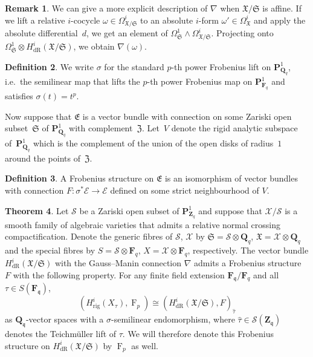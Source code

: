 \documentclass[a4paper,11pt]{article}
\numberwithin{equation}{section}
\newcommand{\ZZ}{\mathbf{Z}} %
\newcommand{\QQ}{\mathbf{Q}} %
\newcommand{\FF}{\mathbf{F}} %
\DeclareMathOperator{\Frob}{F}           %
\providecommand{\HdR}{H_{\text{dR}}}    %
\providecommand{\Hrig}{H_{\text{rig}}}  %
\theoremstyle{definition}
\newtheorem{thm}{Theorem}[section]
\newtheorem{defn}[thm]{Definition}
\newtheorem{rem}[thm]{Remark}
\begin{document}
\begin{rem}
We can give a more explicit description of $\nabla$ when 
$\mathfrak{X}/\mathfrak{S}$ is affine. If we lift a relative $i$-cocycle 
$\omega \in \Omega^i_{\mathfrak{X}/\mathfrak{S}}$ to an absolute $i$-form 
$\omega' \in \Omega^i_{\mathfrak{X}}$ and apply the absolute differential~$d$, 
we get an element of 
$\Omega^1_{\mathfrak{S}} \wedge \Omega^i_{\mathfrak{X}/\mathfrak{S}}$. 
Projecting onto 
$\Omega^1_{\mathfrak{S}} \otimes \HdR^i(\mathfrak{X}/\mathfrak{S})$, 
we obtain $\nabla(\omega)$. 
\end{rem}

\begin{defn} \label{defn:sigma}
We write $\sigma$ for the standard $p$-th power Frobenius lift on 
$\mathbf{P}^1_{\QQ_q}$, i.e.\ the semilinear map that lifts the $p$-th power 
Frobenius map on $\mathbf{P}^1_{\FF_q}$ and satisfies $\sigma(t)=t^p$. 
\end{defn}

Now suppose that $\mathfrak{E}$ is a vector bundle with connection on 
some Zariski open subset~$\mathfrak{S}$ of $\mathbf{P}^1_{\QQ_q}$ with 
complement~$\mathfrak{Z}$. Let~$V$ denote the rigid analytic subspace 
of~$\mathbf{P}^1_{\QQ_q}$ which is the complement of the union of the 
open disks of radius~$1$ around the points of~$\mathfrak{Z}$.

\begin{defn}
A Frobenius structure on $\mathfrak{E}$ is an isomorphism of vector bundles 
with connection $F \colon \sigma^* \mathcal{E} \rightarrow \mathcal{E}$ 
defined on some strict neighbourhood of $V$. 
\end{defn}

\begin{thm} \label{thm:frobstruc}
Let $\mathcal{S}$ be a Zariski open subset of $\mathbf{P}^1_{\ZZ_q}$ and 
suppose that $\mathcal{X}/\mathcal{S}$ is a smooth family of algebraic 
varieties that admits a relative normal crossing compactification. Denote 
the generic fibres of $\mathcal{S}$, $\mathcal{X}$ by 
$\mathfrak{S}=\mathcal{S} \otimes \QQ_q$, $\mathfrak{X}=\mathcal{X} \otimes \QQ_q$ 
and the special fibres by $S=\mathcal{S} \otimes \FF_q$, 
$X=\mathcal{X} \otimes \FF_q$, respectively. The vector bundle 
$\HdR^i(\mathfrak{X}/\mathfrak{S})$ with the Gauss--Manin connection $\nabla$ 
admits a Frobenius structure $F$ with the following property. 
For any finite field extension $\FF_{\mathfrak{q}}/\FF_q$ and
all $\tau \in S(\FF_{\mathfrak{q}})$,
\[
(\Hrig^i(X_{\tau}),\Frob_p) \cong (\HdR^i(\mathfrak{X}/\mathfrak{S}),F)_{\hat{\tau}}
\] 
as $\QQ_{\mathfrak{q}}$-vector spaces with a $\sigma$-semilinear 
endomorphism, where $\hat{\tau} \in \mathcal{S}(\ZZ_{\mathfrak{q}})$ denotes 
the Teichm\"uller lift of $\tau$. We will therefore denote this Frobenius 
structure on $\HdR^i(\mathfrak{X}/\mathfrak{S})$ by $\Frob_p$ as well.
\end{thm}
\end{document}
